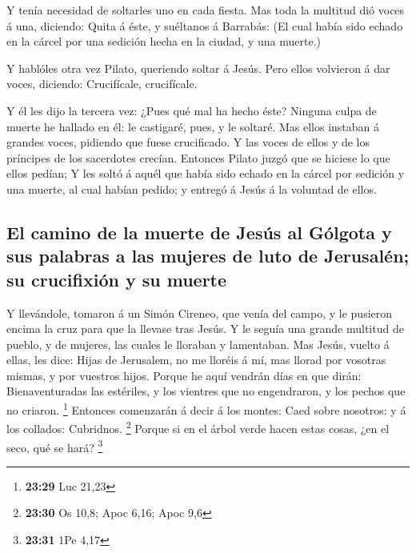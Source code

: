  Y tenía necesidad de soltarles uno en cada fiesta.
 Mas toda la multitud dió voces á una, diciendo: Quita á
éste, y suéltanos á Barrabás:  (El cual había sido echado
en la cárcel por una sedición hecha en la ciudad, y una muerte.)

 Y hablóles otra vez Pilato, queriendo soltar á Jesús.
 Pero ellos volvieron á dar voces, diciendo: Crucifícale,
crucifícale.

 Y él les dijo la tercera vez: ¿Pues qué mal ha hecho
éste? Ninguna culpa de muerte he hallado en él: le castigaré, pues, y le
soltaré.  Mas ellos instaban á grandes voces, pidiendo
que fuese crucificado. Y las voces de ellos y de los príncipes de los
sacerdotes crecían.  Entonces Pilato juzgó que se hiciese
lo que ellos pedían;  Y les soltó á aquél que había sido
echado en la cárcel por sedición y una muerte, al cual habían pedido; y
entregó á Jesús á la voluntad de ellos.

\hypertarget{el-camino-de-la-muerte-de-jesuxfas-al-guxf3lgota-y-sus-palabras-a-las-mujeres-de-luto-de-jerusaluxe9n-su-crucifixiuxf3n-y-su-muerte}{%
\subsection{El camino de la muerte de Jesús al Gólgota y sus palabras a
las mujeres de luto de Jerusalén; su crucifixión y su
muerte}\label{el-camino-de-la-muerte-de-jesuxfas-al-guxf3lgota-y-sus-palabras-a-las-mujeres-de-luto-de-jerusaluxe9n-su-crucifixiuxf3n-y-su-muerte}}

 Y llevándole, tomaron á un Simón Cireneo, que venía del
campo, y le pusieron encima la cruz para que la llevase tras Jesús.
 Y le seguía una grande multitud de pueblo, y de mujeres,
las cuales le lloraban y lamentaban.  Mas Jesús, vuelto á
ellas, les dice: Hijas de Jerusalem, no me lloréis á mí, mas llorad por
vosotras mismas, y por vuestros hijos.  Porque he aquí
vendrán días en que dirán: Bienaventuradas las estériles, y los vientres
que no engendraron, y los pechos que no criaron. \footnote{\textbf{23:29}
  Luc 21,23}  Entonces comenzarán á decir á los montes:
Caed sobre nosotros: y á los collados: Cubridnos. \footnote{\textbf{23:30}
  Os 10,8; Apoc 6,16; Apoc 9,6}  Porque si en el árbol
verde hacen estas cosas, ¿en el seco, qué se hará? \footnote{\textbf{23:31}
  1Pe 4,17}

